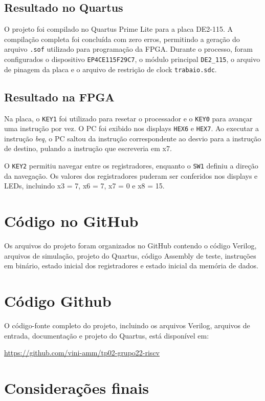 \documentclass[12pt,a4paper]{article}
\begin{document}
\subsection{Resultado no Quartus}

O projeto foi compilado no Quartus Prime Lite para a placa DE2-115. A compilação completa foi concluída com zero erros, permitindo a geração do arquivo \texttt{.sof} utilizado para programação da FPGA. Durante o processo, foram configurados o dispositivo \texttt{EP4CE115F29C7}, o módulo principal \texttt{DE2\_115}, o arquivo de pinagem da placa e o arquivo de restrição de clock \texttt{trabaio.sdc}.

\subsection{Resultado na FPGA}

Na placa, o \texttt{KEY1} foi utilizado para resetar o processador e o \texttt{KEY0} para avançar uma instrução por vez. O PC foi exibido nos displays \texttt{HEX6} e \texttt{HEX7}. Ao executar a instrução \textit{beq}, o PC saltou da instrução correspondente ao desvio para a instrução de destino, pulando a instrução que escreveria em x7.

O \texttt{KEY2} permitiu navegar entre os registradores, enquanto o \texttt{SW1} definiu a direção da navegação. Os valores dos registradores puderam ser conferidos nos displays e LEDs, incluindo x3 = 7, x6 = 7, x7 = 0 e x8 = 15.

\section{Código no GitHub}

Os arquivos do projeto foram organizados no GitHub contendo o código Verilog, arquivos de simulação, projeto do Quartus, código Assembly de teste, instruções em binário, estado inicial dos registradores e estado inicial da memória de dados.

\section{Código Github}

O código-fonte completo do projeto, incluindo os arquivos Verilog, arquivos de entrada, documentação e projeto do Quartus, está disponível em:

\url{https://github.com/vini-amm/tp02-grupo22-riscv}


\section{Considerações finais}
\end{document}

